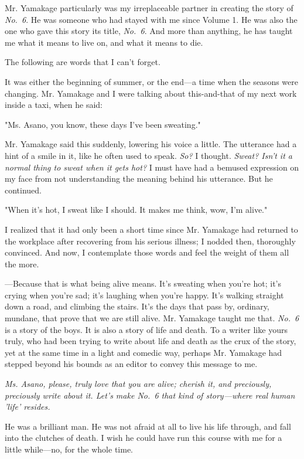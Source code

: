 Mr. Yamakage particularly was my irreplaceable partner in creating the
story of \emph{No.~6}. He was someone who had stayed with me since Volume 1. He
was also the one who gave this story its title, \emph{No.~6}. And more than
anything, he has taught me what it means to live on, and what it means
to die.

The following are words that I can't forget.

It was either the beginning of summer, or the end---a time when the
seasons were changing. Mr. Yamakage and I were talking about
this-and-that of my next work inside a taxi, when he said:

"Ms. Asano, you know, these days I've been sweating."

Mr. Yamakage said this suddenly, lowering his voice a little. The
utterance had a hint of a smile in it, like he often used to speak. \emph{So?}
I thought. \emph{Sweat? Isn't it a normal thing to sweat when it gets hot?} I
must have had a bemused expression on my face from not understanding the
meaning behind his utterance. But he continued.

"When it's hot, I sweat like I should. It makes me think, wow, I'm
alive."

I realized that it had only been a short time since Mr. Yamakage had
returned to the workplace after recovering from his serious illness; I
nodded then, thoroughly convinced. And now, I contemplate those words
and feel the weight of them all the more.

---Because that is what being alive means. It's sweating when you're hot;
it's crying when you're sad; it's laughing when you're happy. It's
walking straight down a road, and climbing the stairs. It's the days
that pass by, ordinary, mundane, that prove that we are still alive. Mr.
Yamakage taught me that. \emph{No.~6} is a story of the boys. It is also a
story of life and death. To a writer like yours truly, who had been
trying to write about life and death as the crux of the story, yet at
the same time in a light and comedic way, perhaps Mr. Yamakage had
stepped beyond his bounds as an editor to convey this message to me.

\emph{Ms. Asano, please, truly love that you are alive; cherish it, and
preciously, preciously write about it. Let's make \emph{No.~6} that kind of
story---where real human 'life' resides.}

He was a brilliant man. He was not afraid at all to live his life
through, and fall into the clutches of death. I wish he could have run
this course with me for a little while---no, for the whole time.

